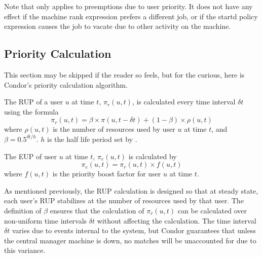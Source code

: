Note that  only applies to preemptions
due to user priority.  It does not have any effect if the machine rank
expression prefers a different job, or if the startd policy expression
causes the job to vacate due to other activity on the machine.

\subsection{Priority Calculation}
This section may be skipped if the reader so feels, but for the curious,
here is Condor's priority calculation algorithm.

The RUP of a user $u$ at time $t$, $\pi_r(u,t)$, is calculated 
every time interval $\delta t$ using the formula 
$$\pi_r(u,t) = \beta\times\pi(u,t-\delta t) + (1-\beta)\times\rho(u,t)$$
where $\rho(u,t)$ is the number of resources used by user $u$ at time $t$,
and $\beta=0.5^{{\delta t}/h}$. $h$ is the half life period set by 
.

The EUP of user $u$ at time $t$, $\pi_e(u,t)$
is calculated by
$$\pi_e(u,t) = \pi_r(u,t)\times f(u,t)$$
where $f(u,t)$ is the priority boost factor for user $u$ at time $t$.

As mentioned previously, the RUP calculation is designed so that at steady
state, each user's RUP stabilizes at the number of resources used by that user. 
The definition of $\beta$ ensures that the calculation of $\pi_r(u,t)$ can be 
calculated over non-uniform time intervals $\delta t$ without affecting the 
calculation.  The time interval $\delta t$ varies due to events internal to 
the system, but Condor guarantees that unless the central manager machine is 
down, no matches will be unaccounted for due to this variance.

%  

